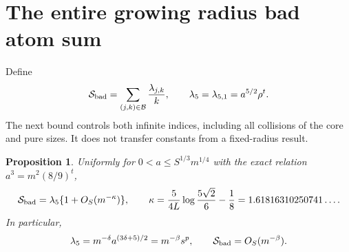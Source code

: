 \documentclass[11pt,letterpaper]{article}
\numberwithin{equation}{section}
\newtheorem{proposition}[theorem]{Proposition}
\theoremstyle{definition}\newtheorem{definition}[theorem]{Definition}
\theoremstyle{remark}\newtheorem{remark}[theorem]{Remark}
\newcommand{\Bad}{\mathcal B}
\begin{document}
\section{The entire growing radius bad atom sum}
Define
\begin{equation}\label{det:grow:eq:Sbad}
 \mathcal S_{\rm bad}=\sum_{(j,k)\in\Bad}\frac{\lambda_{j,k}}k,
 \qquad\lambda_5=\lambda_{5,1}=a^{5/2}\rho^t.
\end{equation}
The next bound controls both infinite indices, including all collisions
of the core and pure sizes. It does not transfer constants from a
fixed-radius result.

\begin{proposition}\label{det:grow:prop:bad}
Uniformly for $0<a\le S^{1/3}m^{1/4}$ with the exact relation
$a^3=m^2(8/9)^t$,
\begin{equation}\label{det:grow:eq:bad-asymp}
 \mathcal S_{\rm bad}=\lambda_5\{1+O_S(m^{-\kappa})\},\qquad
 \kappa=\frac5{4L}\log\frac{5\sqrt2}{6}-\frac18
       =1.61816310250741\ldots.
\end{equation}
In particular,
\begin{equation}\label{det:grow:eq:lambda5}
 \lambda_5=m^{-\delta}a^{(3\delta+5)/2}=m^{-\beta}s^p,
 \qquad\mathcal S_{\rm bad}=O_S(m^{-\beta}).
\end{equation}
\end{proposition}
\end{document}
